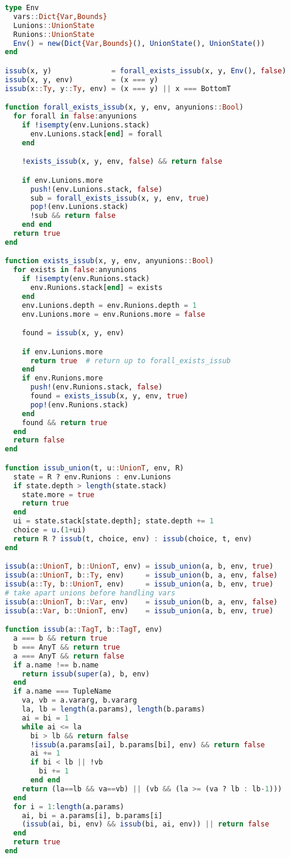 \begin{singlespace}
\begin{lstlisting}[language=julia]
type Env
  vars::Dict{Var,Bounds}
  Lunions::UnionState
  Runions::UnionState
  Env() = new(Dict{Var,Bounds}(), UnionState(), UnionState())
end

issub(x, y)              = forall_exists_issub(x, y, Env(), false)
issub(x, y, env)         = (x === y)
issub(x::Ty, y::Ty, env) = (x === y) || x === BottomT

function forall_exists_issub(x, y, env, anyunions::Bool)
  for forall in false:anyunions
    if !isempty(env.Lunions.stack)
      env.Lunions.stack[end] = forall
    end

    !exists_issub(x, y, env, false) && return false

    if env.Lunions.more
      push!(env.Lunions.stack, false)
      sub = forall_exists_issub(x, y, env, true)
      pop!(env.Lunions.stack)
      !sub && return false
    end end
  return true
end

function exists_issub(x, y, env, anyunions::Bool)
  for exists in false:anyunions
    if !isempty(env.Runions.stack)
      env.Runions.stack[end] = exists
    end
    env.Lunions.depth = env.Runions.depth = 1
    env.Lunions.more = env.Runions.more = false

    found = issub(x, y, env)

    if env.Lunions.more
      return true  # return up to forall_exists_issub
    end
    if env.Runions.more
      push!(env.Runions.stack, false)
      found = exists_issub(x, y, env, true)
      pop!(env.Runions.stack)
    end
    found && return true
  end
  return false
end

function issub_union(t, u::UnionT, env, R)
  state = R ? env.Runions : env.Lunions
  if state.depth > length(state.stack)
    state.more = true
    return true
  end
  ui = state.stack[state.depth]; state.depth += 1
  choice = u.(1+ui)
  return R ? issub(t, choice, env) : issub(choice, t, env)
end

issub(a::UnionT, b::UnionT, env) = issub_union(a, b, env, true)
issub(a::UnionT, b::Ty, env)     = issub_union(b, a, env, false)
issub(a::Ty, b::UnionT, env)     = issub_union(a, b, env, true)
# take apart unions before handling vars
issub(a::UnionT, b::Var, env)    = issub_union(b, a, env, false)
issub(a::Var, b::UnionT, env)    = issub_union(a, b, env, true)

function issub(a::TagT, b::TagT, env)
  a === b && return true
  b === AnyT && return true
  a === AnyT && return false
  if a.name !== b.name
    return issub(super(a), b, env)
  end
  if a.name === TupleName
    va, vb = a.vararg, b.vararg
    la, lb = length(a.params), length(b.params)
    ai = bi = 1
    while ai <= la
      bi > lb && return false
      !issub(a.params[ai], b.params[bi], env) && return false
      ai += 1
      if bi < lb || !vb
        bi += 1
      end end
    return (la==lb && va==vb) || (vb && (la >= (va ? lb : lb-1)))
  end
  for i = 1:length(a.params)
    ai, bi = a.params[i], b.params[i]
    (issub(ai, bi, env) && issub(bi, ai, env)) || return false
  end
  return true
end


\end{lstlisting}
\end{singlespace}
